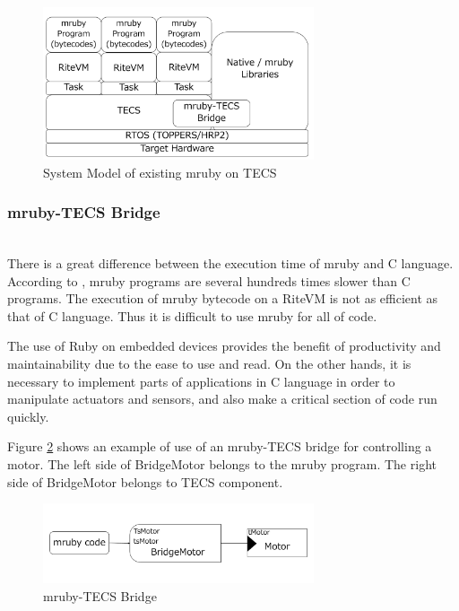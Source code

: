 \documentclass[submit]{ipsj_v2/UTF8/ipsj}
\begin{document}
\begin{figure}[t]
    \centering
    \includegraphics[width=8cm,clip]{../EMSOFT2016/figure/mrubyontecs.pdf}
    \caption{System Model of existing mruby on TECS}
    \label{fig:mrubyontecs}
\end{figure}

\subsubsection{mruby-TECS Bridge}\mbox{}\\

There is a great difference between the execution time of mruby and C language.
According to  \cite{par:mrubyonTECS}, mruby programs are several hundreds times slower than C programs.
The execution of mruby bytecode on a RiteVM is not as efficient as that of C language.
Thus it is difficult to use mruby for all of code.

The use of Ruby on embedded devices provides the benefit of productivity and maintainability due to the ease to use and read.
On the other hands, it is necessary to implement parts of applications in C language in order to manipulate actuators and sensors, and also make a critical section of code run quickly.

Figure \ref{fig:mruby_TECS_bridge} shows an example of use of an mruby-TECS bridge for controlling a motor.
The left side of BridgeMotor belongs to the mruby program.
The right side of BridgeMotor belongs to TECS component.
\begin{figure}[t]
    \centering
    \includegraphics[width=8cm,clip]{../EMSOFT2016/figure/mruby_TECS_bridge.pdf}
    \caption{mruby-TECS Bridge}
    \label{fig:mruby_TECS_bridge}
\end{figure}
\end{document}
